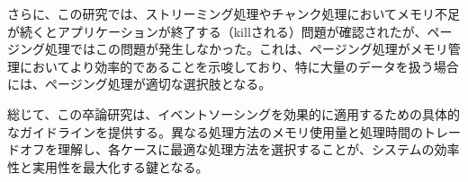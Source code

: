 \documentclass[../../main]{subfiles}
\begin{document}
    さらに、この研究では、ストリーミング処理やチャンク処理においてメモリ不足が続くとアプリケーションが終了する（killされる）問題が確認されたが、ページング処理ではこの問題が発生しなかった。これは、ページング処理がメモリ管理においてより効率的であることを示唆しており、特に大量のデータを扱う場合には、ページング処理が適切な選択肢となる。

    総じて、この卒論研究は、イベントソーシングを効果的に適用するための具体的なガイドラインを提供する。異なる処理方法のメモリ使用量と処理時間のトレードオフを理解し、各ケースに最適な処理方法を選択することが、システムの効率性と実用性を最大化する鍵となる。
    \clearpage
\end{document}
